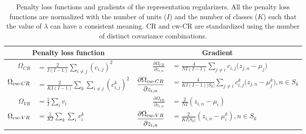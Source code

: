 \begin{table}[t]
\caption{Penalty loss functions and gradients of the representation regularizers. All the penalty loss functions are normalized with the number of units ($I$) and the number of classes ($K$) such that the value of $\lambda$ can have a consistent meaning. CR and cw-CR are standardized using the number of distinct covariance combinations.}
\centering
\begin{tabular}{rlrl}
		\hline
		\multicolumn{2}{c}{Penalty loss function}  & \multicolumn{2}{c}{Gradient}  \\ \hline
		$\displaystyle{\Omega}_{CR}$ & $\displaystyle=\frac{2}{I(I-1)}\sum_{i\neq j} (c_{i,j})^{2} $    & $\displaystyle\frac{\partial{{\Omega}_{CR}}}{\partial{z_{i,n}}}$ & $\displaystyle=\frac{4}{NI(I-1)}\sum_{j\neq{i}}^{}{c_{i,j}(z_{j,n}-\mu_{j}})$  \\ 
		
		$\displaystyle{\Omega}_{cw{\text -}CR}$ & $\displaystyle=\frac{2}{KI(I-1)}\sum_k \sum_{i\neq j} (c_{i,j}^{k})^{2} $   & $\displaystyle\frac{\partial{{\Omega}_{cw{\text-}CR}}}{\partial{z_{i,n}}}$ & $\displaystyle=\frac{4}{KI(I-1)|S_k|}\sum_{j\neq{i}}^{}{c_{i,j}^{k}(z_{j,n}-\mu_{j}^{k}}),  n \in S_k$  \\ 
		
		$\displaystyle{\Omega}_{VR}$ & $\displaystyle=\frac{1}{I}\sum_i v_{i}$                                               & $\displaystyle\frac{\partial{{\Omega}_{VR}}}{\partial{z_{i,n}}}$ & $\displaystyle=\frac{2}{NI}(z_{i,n}-\mu_{i})$  \\
		
		$\displaystyle{\Omega}_{cw{\text -}VR}$ & $\displaystyle=\frac{1}{K I}\sum_k \sum_i v_{i}^k $                        & $\displaystyle\frac{\partial{{\Omega}_{cw{\text -}VR}}}{\partial{{z}_{i,n}}}$ & $\displaystyle =\frac{2}{KI|S_k|}({z}_{i,n}-{\mu}_{i}^{k}), n \in S_k$  \\ \hline
	\end{tabular}
\label{table:loss_function}
\end{table}

